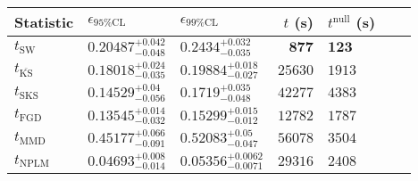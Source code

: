 \begin{tabular}{l|llr|llr}
Statistic & $\epsilon_{95\%\mathrm{CL}}$ & $\epsilon_{99\%\mathrm{CL}}$ & $t$ (s) & $t^{\mathrm{null}}$ (s) \\
	\midrule
	$t_{\mathrm{SW}}$ & $0.20487_{-0.048}^{+0.042}$ & $0.2434_{-0.035}^{+0.032}$ & ${\mathbf{877}}$ & ${\mathbf{123}}$ \\
	$t_{\overline{\mathrm{KS}}}$ & $0.18018_{-0.035}^{+0.024}$ & $0.19884_{-0.027}^{+0.018}$ & $25630$ & $1913$ \\
	$t_{\mathrm{SKS}}$ & $0.14529_{-0.056}^{+0.04}$ & $0.1719_{-0.048}^{+0.035}$ & $42277$ & $4383$ \\
	$t_{\mathrm{FGD}}$ & ${\mathbf{0.13545_{-0.032}^{+0.014}}}$ & ${\mathbf{0.15299_{-0.012}^{+0.015}}}$ & $12782$ & $1787$ \\
	$t_{\mathrm{MMD}}$ & $0.45177_{-0.091}^{+0.066}$ & $0.52083_{-0.047}^{+0.05}$ & $56078$ & $3504$ \\
\rowcolor{red!35}	$t_{\mathrm{NPLM}}$ & $0.04693_{-0.014}^{+0.008}$ & $0.05356_{-0.0071}^{+0.0062}$ & $29316$ & $2408$ \\
	\bottomrule
\end{tabular}